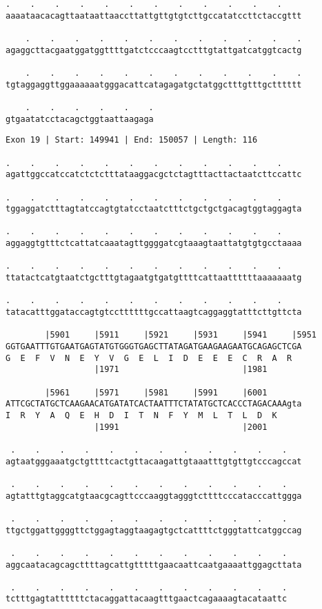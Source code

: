 \documentclass{article}
\begin{document}
\newpage
\begin{Verbatim}[fontfamily=courier]
    .    .    .    .    .    .    .    .    .    .    .    .
aaaataacacagttaataattaaccttattgttgtgtcttgccatatccttctaccgttt

    .    .    .    .    .    .    .    .    .    .    .    .
agaggcttacgaatggatggttttgatctcccaagtcctttgtattgatcatggtcactg

    .    .    .    .    .    .    .    .    .    .    .    .
tgtaggaggttggaaaaaatgggacattcatagagatgctatggctttgtttgctttttt

    .    .    .    .    .    .
gtgaatatcctacagctggtaattaagaga
\end{Verbatim}
\newpage
\begin{Verbatim}[fontfamily=courier]
Exon 19 | Start: 149941 | End: 150057 | Length: 116

.    .    .    .    .    .    .    .    .    .    .    .    
agattggccatccatctctctttataaggacgctctagtttacttactaatcttccattc

.    .    .    .    .    .    .    .    .    .    .    .    
tggaggatctttagtatccagtgtatcctaatctttctgctgctgacagtggtaggagta

.    .    .    .    .    .    .    .    .    .    .    .    
aggaggtgtttctcattatcaaatagttggggatcgtaaagtaattatgtgtgcctaaaa

.    .    .    .    .    .    .    .    .    .    .    .    
ttatactcatgtaatctgctttgtagaatgtgatgttttcattaattttttaaaaaaatg

.    .    .    .    .    .    .    .    .    .    .    .    
tatacatttggataccagtgtccttttttgccattaagtcaggaggtatttcttgttcta

        |5901     |5911     |5921     |5931     |5941     |5951
GGTGAATTTGTGAATGAGTATGTGGGTGAGCTTATAGATGAAGAAGAATGCAGAGCTCGA
G  E  F  V  N  E  Y  V  G  E  L  I  D  E  E  E  C  R  A  R  
                  |1971                         |1981       

        |5961     |5971     |5981     |5991     |6001       
ATTCGCTATGCTCAAGAACATGATATCACTAATTTCTATATGCTCACCCTAGACAAAgta
I  R  Y  A  Q  E  H  D  I  T  N  F  Y  M  L  T  L  D  K     
                  |1991                         |2001       

 .    .    .    .    .    .    .    .    .    .    .    .   
agtaatgggaaatgctgttttcactgttacaagattgtaaatttgtgttgtcccagccat

 .    .    .    .    .    .    .    .    .    .    .    .   
agtatttgtaggcatgtaacgcagttcccaaggtagggtcttttcccatacccattggga

 .    .    .    .    .    .    .    .    .    .    .    .   
ttgctggattggggttctggagtaggtaagagtgctcattttctgggtattcatggccag

 .    .    .    .    .    .    .    .    .    .    .    .   
aggcaatacagcagcttttagcattgtttttgaacaattcaatgaaaattggagcttata

 .    .    .    .    .    .    .    .    .    .    .    .
tctttgagtattttttctacaggattacaagtttgaactcagaaaagtacataattc
\end{Verbatim}
\end{document}

